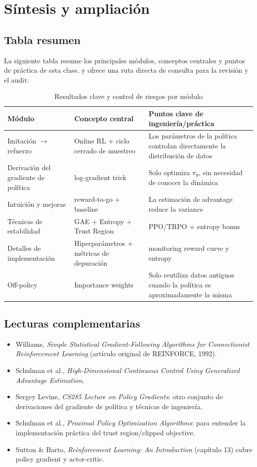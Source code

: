 \section{Síntesis y ampliación}

\subsection{Tabla resumen}
La siguiente tabla resume los principales módulos, conceptos centrales y puntos de práctica de esta clase, y ofrece una ruta directa de consulta para la revisión y el audit:

\begin{table}[H]
\centering
\small
\begin{tabular}{p{}p{}p{}}
\toprule
Módulo & Concepto central & Puntos clave de ingeniería/práctica \\
\midrule
Imitación \(\to\) refuerzo & Online RL + ciclo cerrado de muestreo & Los parámetros de la política controlan directamente la distribución de datos \\
Derivación del gradiente de política & log-gradient trick & Solo optimiza \(\pi_\theta\), sin necesidad de conocer la dinámica \\
Intuición y mejoras & reward-to-go + baseline & La estimación de advantage reduce la variance \\
Técnicas de estabilidad & GAE + Entropy + Trust Region & PPO/TRPO + entropy bonus \\
Detalles de implementación & Hiperparámetros + métricas de depuración & monitoring reward curve y entropy \\
Off-policy & Importance weights & Solo reutiliza datos antiguos cuando la política es aproximadamente la misma \\
\bottomrule
\end{tabular}
\caption{Resultados clave y control de riesgos por módulo}
\end{table}

\subsection{Lecturas complementarias}
\begin{itemize}
    \item Williams, \textit{Simple Statistical Gradient-Following Algorithms for Connectionist Reinforcement Learning} (artículo original de REINFORCE, 1992).
    \item Schulman et al., \textit{High-Dimensional Continuous Control Using Generalized Advantage Estimation}.
    \item Sergey Levine, \textit{CS285 Lecture on Policy Gradients}: otro conjunto de derivaciones del gradiente de política y técnicas de ingeniería.
    \item Schulman et al., \textit{Proximal Policy Optimization Algorithms}: para entender la implementación práctica del trust region/clipped objective.
    \item Sutton \& Barto, \textit{Reinforcement Learning: An Introduction} (capítulo 13) cubre policy gradient y actor-critic.
\end{itemize}

